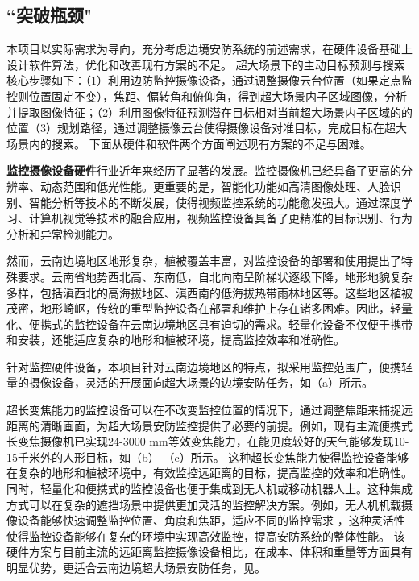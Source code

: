 \subsection{``突破瓶颈"}

本项目以实际需求为导向，充分考虑边境安防系统的前述需求，在硬件设备基础上设计软件算法，优化和改善现有方案的不足。
超大场景下的主动目标预测与搜索核心步骤如下：（1）利用边防监控摄像设备，通过调整摄像云台位置（如果定点监控则位置固定不变），焦距、偏转角和俯仰角，得到超大场景内子区域图像，分析并提取图像特征；（2）利用图像特征预测潜在目标相对当前超大场景内子区域的的位置（3）规划路径，通过调整摄像云台使得摄像设备对准目标，完成目标在超大场景内的搜索。
下面从硬件和软件两个方面阐述现有方案的不足与困难。

\textbf{监控摄像设备硬件}行业近年来经历了显著的发展。监控摄像机已经具备了更高的分辨率、动态范围和低光性能。更重要的是，智能化功能如高清图像处理、人脸识别、智能分析等技术的不断发展，使得视频监控系统的功能愈发强大。通过深度学习、计算机视觉等技术的融合应用，视频监控设备具备了更精准的目标识别、行为分析和异常检测能力。

然而，云南边境地区地形复杂，植被覆盖丰富，对监控设备的部署和使用提出了特殊要求。云南省地势西北高、东南低，自北向南呈阶梯状逐级下降，地形地貌复杂多样，包括滇西北的高海拔地区、滇西南的低海拔热带雨林地区等。这些地区植被茂密，地形崎岖，传统的重型监控设备在部署和维护上存在诸多困难。因此，轻量化、便携式的监控设备在云南边境地区具有迫切的需求。轻量化设备不仅便于携带和安装，还能适应复杂的地形和植被环境，提高监控效率和准确性。

针对监控硬件设备，本项目针对云南边境地区的特点，拟采用监控范围广，便携轻量的摄像设备，灵活的开展面向超大场景的边境安防任务，如（a）所示。

超长变焦能力的监控设备可以在不改变监控位置的情况下，通过调整焦距来捕捉远距离的清晰画面，为超大场景安防监控提供了必要的前提。例如，现有主流便携式长变焦摄像机已实现24-3000 mm等效变焦能力，在能见度较好的天气能够发现10-15千米外的人形目标，如（b）-（c）所示。
这种超长变焦能力使得监控设备能够在复杂的地形和植被环境中，有效监控远距离的目标，提高监控的效率和准确性。
同时，轻量化和便携式的监控设备也便于集成到无人机或移动机器人上。这种集成方式可以在复杂的遮挡场景中提供更加灵活的监控解决方案。例如，无人机机载摄像设备能够快速调整监控位置、角度和焦距，适应不同的监控需求
，这种灵活性使得监控设备能够在复杂的环境中实现高效监控，提高安防系统的整体性能。
该硬件方案与目前主流的远距离监控摄像设备相比，在成本、体积和重量等方面具有明显优势，更适合云南边境超大场景安防任务，见。


